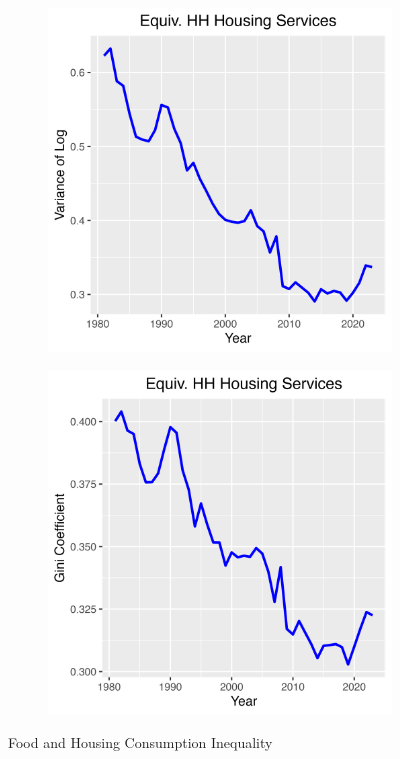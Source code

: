 \documentclass{article}
\begin{document}
\begin{figure}
\begin{subfigure}[t]{0.475\textwidth}
    \end{subfigure}
    \begin{subfigure}[t]{0.475\textwidth}
        \centering
        \includegraphics[width=\textwidth]{figures/Fig_8/Fig_8c_Var_Housing.png}
    \end{subfigure}
    \begin{subfigure}[t]{0.475\textwidth}
        \centering
        \includegraphics[width=\textwidth]{figures/Fig_8/Fig_8d_Gini_Housing.png}
    \end{subfigure}
    \caption{Food and Housing Consumption Inequality}
    \label{fig:Food_Housing}
\end{figure}
\end{document}
